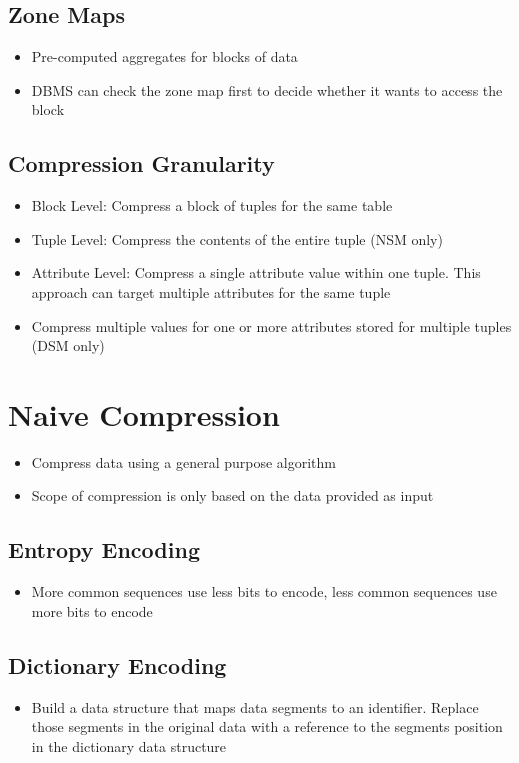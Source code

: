 \documentclass[11pt]{article}
\begin{document}
    \subsection*{Zone Maps}
    \begin{itemize}
        \item Pre-computed aggregates for blocks of data
        \item DBMS can check the zone map first to decide whether it wants to access the block
    \end{itemize}

    \subsection*{Compression Granularity}
    \begin{itemize}
        \item Block Level: Compress a block of tuples for the same table
        \item Tuple Level: Compress the contents of the entire tuple (NSM only)
        \item Attribute Level: Compress a single attribute value within one tuple. This approach can target multiple attributes for the same tuple
        \item Compress multiple values for one or more attributes stored for multiple tuples (DSM only)
    \end{itemize}

\section{Naive Compression}
\begin{itemize}
    \item Compress data using a general purpose algorithm
    \item Scope of compression is only based on the data provided as input
\end{itemize}
    \subsection*{Entropy Encoding}
    \begin{itemize}
        \item More common sequences use less bits to encode, less common sequences use more bits to encode
    \end{itemize}
    \subsection*{Dictionary Encoding}
    \begin{itemize}
        \item Build a data structure that maps data segments to an identifier. Replace those segments in the original data with a reference to the segments position in the dictionary data structure
    \end{itemize}
\end{document}
